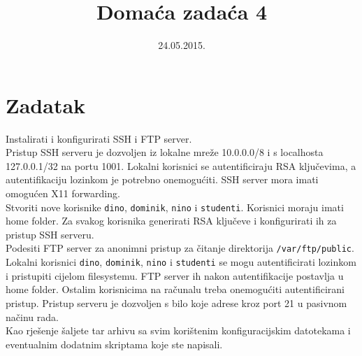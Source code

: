 \documentclass[12pt,a4paper]{article}
\begin{document}
	\title{Domaća zadaća 4}
	\date{\vspace{-5ex} 24.05.2015.}
	\maketitle
	

\section*{Zadatak}

Instalirati i konfigurirati SSH i FTP server.\\

Pristup SSH serveru je dozvoljen iz lokalne mreže 10.0.0.0/8 i s localhosta 127.0.0.1/32 na portu 1001. Lokalni korisnici se autentificiraju RSA ključevima, a autentifikaciju lozinkom je potrebno onemogućiti. SSH server mora imati omogućen X11 forwarding.\\
Stvoriti nove korisnike \texttt{dino}, \texttt{dominik}, \texttt{nino} i \texttt{studenti}. Korisnici moraju imati home folder. Za svakog korisnika generirati RSA ključeve i konfigurirati ih za pristup SSH serveru.\\

Podesiti FTP server za anonimni pristup za čitanje direktorija \texttt{/var/ftp/public}. Lokalni korisnici \texttt{dino}, \texttt{dominik}, \texttt{nino} i \texttt{studenti} se mogu autentificirati lozinkom i pristupiti cijelom filesystemu. FTP server ih nakon autentifikacije postavlja u home folder. Ostalim korisnicima na računalu treba onemogućiti autentificirani pristup. Pristup serveru je dozvoljen s bilo koje adrese kroz port 21 u pasivnom načinu rada.\\

Kao rješenje šaljete tar arhivu sa svim korištenim konfiguracijskim datotekama i eventualnim dodatnim skriptama koje ste napisali.
\end{document}
